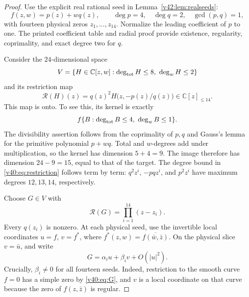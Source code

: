 \documentclass[UTF8,11pt]{ctexart}
\theoremstyle{definition}
\numberwithin{equation}{section}
\begin{document}
\begin{proof}
Use the explicit real rational seed in Lemma~\ref{v42:lem:realseeds}:
\[
 f(z,w)=p(z)+wq(z),\qquad \deg p=4,\quad\deg q=2,
 \quad\gcd(p,q)=1,
\]
with fourteen physical zeros $z_1,\ldots,z_{14}$.
Normalize the leading coefficient of $p$ to one. The printed
coefficient table and radial proof provide existence, regularity,
coprimality, and exact degree two for $q$.

Consider the $24$-dimensional space
\[
 V=\{H\in\mathbb C[z,w]:\deg_{\rm tot}H\le8,\ \deg_wH\le2\}
\]
and its restriction map
\begin{equation}\label{v40:eq:restriction}
 \mathcal R(H)(z)=q(z)^2H\bigl(z,-p(z)/q(z)\bigr)
                 \in\mathbb C[z]_{\le14}.
\end{equation}
This map is onto. To see this, its kernel is exactly
\[
 f\{B:\deg_{\rm tot}B\le4,\ \deg_wB\le1\}.
\]
The divisibility assertion follows from the coprimality of
$p,q$ and Gauss's lemma for the primitive polynomial $p+wq$.
Total and $w$-degrees add under multiplication, so the kernel
has dimension $5+4=9$. The image therefore has dimension
$24-9=15$, equal to that of the target. The degree bound in
\eqref{v40:eq:restriction} follows term by term:
$q^2z^i$, $-pqz^i$, and $p^2z^i$ have maximum degrees
$12,13,14$, respectively.

Choose $G\in V$ with
\begin{equation}\label{v40:eq:G}
                  \mathcal R(G)=\prod_{i=1}^{14}(z-z_i).
\end{equation}
Every $q(z_i)$ is nonzero. At each physical seed, use the
invertible local coordinates $u=f$, $v=f^*$, where
$f^*(z,w)=\overline{f(\bar w,\bar z)}$. On the physical
slice $v=\bar u$, and write
\[
 G=\alpha_i u+\beta_i v+O(|u|^2).
\]
Crucially, $\beta_i\ne0$ for all fourteen seeds. Indeed,
restriction to the smooth curve $f=0$ has a simple zero by
\eqref{v40:eq:G}, and $v$ is a local coordinate on that
curve because the zero of $f(z,\bar z)$ is regular.


\end{proof}
\end{document}
